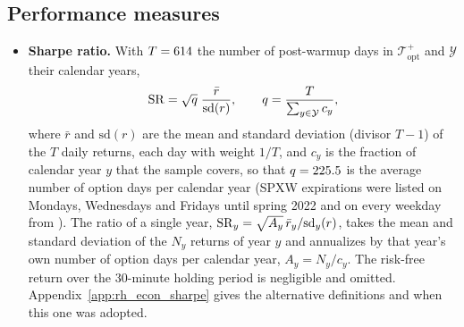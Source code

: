 \subsection{Performance measures}
\label{sec:rh_econ_measures}
\begin{itemize}
\item \textbf{Sharpe ratio.} With $T = 614$ the number of post-warmup days in $\mathcal T_{\mathrm{opt}}^{+}$
  and $\mathcal Y$ their \rheNYears{} calendar years,
  \[
    \mathrm{SR} = \sqrt{q}\;\frac{\bar r}{\mathrm{sd}(r)},
    \qquad
    q = \frac{T}{\sum_{y \in \mathcal Y} c_y},
  \]
  where $\bar r$ and $\mathrm{sd}(r)$ are the mean and standard deviation (divisor $T - 1$) of the $T$ daily returns,
  each day with weight $1/T$, and $c_y$ is the fraction of calendar year $y$ that the sample covers, so that
  $q = 225.5$ is the average number of option days per calendar year (SPXW expirations were listed on Mondays,
  Wednesdays and Fridays until spring 2022 and on every weekday from \rheSplitDate). The ratio of a single year,
  $\mathrm{SR}_y = \sqrt{A_y}\,\bar r_y/\mathrm{sd}_y(r)$, takes the mean and standard deviation of the $N_y$ returns of year
  $y$ and annualizes by that year's own number of option days per calendar year, $A_y = N_y/c_y$. The risk-free
  return over the 30-minute holding period is negligible and omitted. Appendix~\ref{app:rh_econ_sharpe} gives the
  alternative definitions and when this one was adopted.

\end{itemize}
